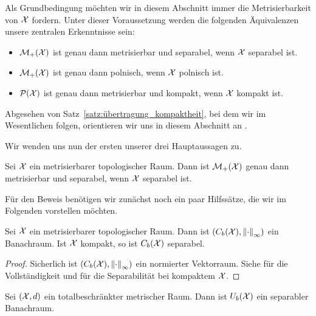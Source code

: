 \documentclass[../thesis/thesis.tex]{subfiles}
\begin{document}
	Als Grundbedingung möchten wir in diesem Abschnitt immer die Metrisierbarkeit von $\mathcal{X}$ fordern.
	Unter dieser Voraussetzung werden die folgenden Äquivalenzen unsere zentralen Erkenntnisse sein:
	\vspace*{0.5em}
	\begin{itemize}
		\item $\mathcal{M}_{+}(\mathcal{X})$ ist genau dann metrisierbar und separabel, wenn $\mathcal{X}$ separabel ist.
		\item $\mathcal{M}_{+}(\mathcal{X})$ ist genau dann polnisch, wenn $\mathcal{X}$ polnisch ist.
		\item $\mathcal{P}(\mathcal{X})$ ist genau dann metrisierbar und kompakt, wenn $\mathcal{X}$ kompakt ist.
	\end{itemize}
	\vspace*{0.5em}
	Abgesehen von Satz~\ref{satz:übertragung_kompaktheit}, bei dem wir im Wesentlichen \cite{vanGaans.200203} folgen, orientieren wir uns in diesem Abschnitt an \cite{Varadarajan.1958}.
	
	Wir wenden uns nun der ersten unserer drei Hauptaussagen zu.
	
	\begin{Satz}
		\label{satz:übertragung_metrisierbarkeit_separabilität}
		Sei $\mathcal{X}$ ein metrisierbarer topologischer Raum. Dann ist $\mathcal{M}_{+}(\mathcal{X})$ genau dann metrisierbar und separabel, wenn $\mathcal{X}$ separabel ist.
	\end{Satz}

	Für den Beweis benötigen wir zunächst noch ein paar Hilfssätze, die wir im Folgenden vorstellen möchten.
	
	\begin{Hilfssatz}
		\label{hilfssatz:beschränkte_stetige_funktionen_banachraum}
		Sei $\mathcal{X}$ ein metrisierbarer topologischer Raum. Dann ist $(C_b(\mathcal{X}), \left\lVert\cdot\right\rVert_\infty)$ ein Banachraum. Ist $\mathcal{X}$ kompakt, so ist $C_b(\mathcal{X})$ separabel.
	\end{Hilfssatz}

	\begin{proof}
		Sicherlich ist $(C_b(\mathcal{X}), \left\lVert\cdot\right\rVert_\infty)$ ein normierter Vektorraum. Siehe \cite[Satz 2.1.6]{Simon.2015} für die Vollständigkeit und
		\cite[Satz 2.3.7]{Simon.2015} für die Separabilität bei kompaktem $\mathcal{X}$.
	\end{proof}
	
	\begin{Hilfssatz}
		\label{hilfssatz:beschränkte_glm_stetige_funktionen_banachraum}
		Sei $(\mathcal{X}, d)$ ein totalbeschränkter metrischer Raum. Dann ist $U_b(\mathcal{X})$ ein separabler Banachraum.
	\end{Hilfssatz}
	
\end{document}
